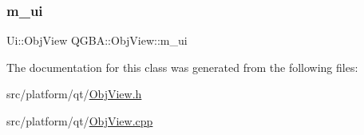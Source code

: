 \subsubsection{\texorpdfstring{m\+\_\+ui}{m\_ui}}
{\footnotesize\ttfamily Ui\+::\+Obj\+View Q\+G\+B\+A\+::\+Obj\+View\+::m\+\_\+ui\hspace{0.3cm}{\ttfamily [private]}}



The documentation for this class was generated from the following files\+:\begin{DoxyCompactItemize}
\item 
src/platform/qt/\mbox{\hyperlink{_obj_view_8h}{Obj\+View.\+h}}\item 
src/platform/qt/\mbox{\hyperlink{_obj_view_8cpp}{Obj\+View.\+cpp}}\end{DoxyCompactItemize}
